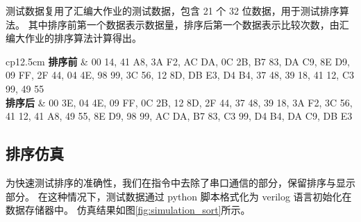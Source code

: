 \documentclass[a4paper]{article}  %
\begin{document}
测试数据复用了汇编大作业的测试数据，包含 21 个 32 位数据，用于测试排序算法。
其中排序前第一个数据表示数据量，排序后第一个数据表示比较次数，由汇编大作业的排序算法计算得出。

\begin{table}[htb]
    \centering
    \caption{
        测试数据
    }\label{tab:test_data}
    \begin{tabular}{{cp{12.5cm}}}
        \toprule
        \textbf{排序前} & 00 14, 41 A8, 3A F2, AC DA, 0C 2B, B7 83, DA C9, 8E D9, 09 FF, 2F 44, 04 4E, 98 99, 3C 56, 12 8D, DB E3, D4 B4, 37 48, 39 18, 41 12, C3 99, 49 55 \\
        \midrule
        \textbf{排序后} & 00 3E, 04 4E, 09 FF, 0C 2B, 12 8D, 2F 44, 37 48, 39 18, 3A F2, 3C 56, 41 12, 41 A8, 49 55, 8E D9, 98 99, AC DA, B7 83, C3 99, D4 B4, DA C9, DB E3 \\
        \bottomrule
    \end{tabular}
\end{table}

\subsection{排序仿真}

为快速测试排序的准确性，我们在指令中去除了串口通信的部分，保留排序与显示部分。
在这种情况下，测试数据通过 python 脚本格式化为 verilog 语言初始化在数据存储器中。
仿真结果如图\ref{fig:simulation_sort}所示。
\end{document}
